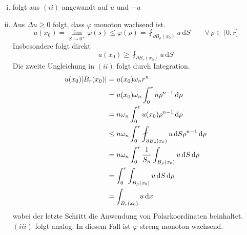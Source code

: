 	\begin{beweis}
		\begin{enumerate}[(i)]
			\item folgt aus $(ii)$ angewandt auf $u$ und $-u$
			\item Aus $\Delta u \geq 0$ folgt, dass $\varphi$ monoton wachsend ist.
			\begin{equation}
				u(x_0) = \lim_{S \to 0^+} \varphi(s) \leq \varphi(\rho) = \fint_{\partial B_{\rho}(x_0)}^{}u \,\mathrm{d}S \qquad \forall\, \rho \in (0,r]
			\end{equation}
			Insbesondere folgt direkt
			\[
				u(x_0) \geq \fint_{\partial B_r(x_0)}^{}u \,\mathrm{d}S
			\]
			Die zweite Ungleichung in $(ii)$ folgt durch Integration.
			\begin{align*}
				u(x_0)\abs{B_r(x_0)} &= u(x_0) \omega_n r^n \\ &= u(x_0) \omega_n \int_{0}^{r}n \rho^{n-1} \,\mathrm{d}\rho \\ 
				&= n\omega_n \int_{0}^{r}u(x_0)\rho^{n-1} \,\mathrm{d}\rho  \\
				&\leq n \omega_n \int_{0}^{r}\fint_{\partial B_{\rho}(x_0)}^{} u \,\mathrm{d}S \rho^{n-1} \,\mathrm{d}\rho \\
				&= n \omega_n \int_{0}^{r} \frac{1}{S_n} \int_{B_{\rho}(x_0)}^{} u \,\mathrm{d}S \,\mathrm{d}\rho \\
				&= \int_{0}^{r} \int_{B_{\rho}(x_0)}^{}u \,\mathrm{d}S \,\mathrm{d}\rho \\
				&= \int_{B_{r}(x_0)}^{}u \,\mathrm{d}x
			\end{align*}
			wobei der letzte Schritt die Anwendung von Polarkoordinaten beinhaltet. $(iii)$ folgt analog. In diesem Fall ist $\varphi$ streng monoton wachsend.
			\end{enumerate}
	\end{beweis}

